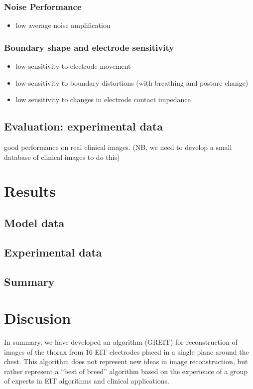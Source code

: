 \documentclass[12pt]{iopart}
\begin{document}
\subsubsection{ Noise Performance}
   \begin{itemize}
   \item low average noise amplification
   \end{itemize}

\subsubsection{ Boundary shape and electrode sensitivity}
   \begin{itemize}
   \item low sensitivity to electrode movement
   \item low sensitivity to boundary distortions
         (with breathing and posture change)
   \item low sensitivity to changes in electrode contact impedance
   \end{itemize}


\subsection{Evaluation: experimental data}


 good performance on real clinical images.
     (NB, we need to develop a small database of 
          clinical images to do this)

\section{Results}
\subsection{Model data}
\subsection{Experimental data}
\subsection{Summary}
\section{Discusion}

In summary, we have developed an algorithm (GREIT)
for reconstruction of images of the thorax
from 16 EIT electrodes placed in a single plane
around the chest. This algorithm does not represent
new ideas in image reconstruction, but rather represent
a ``best of breed'' algorithm based on the experience
of a group of experts in EIT algorithms and clinical
applications.
\end{document}
